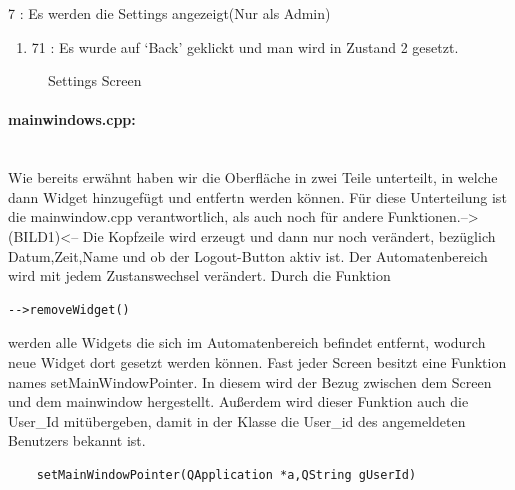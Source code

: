 \documentclass[11pt,a4paper]{article} %
\begin{document}
		7 : Es werden die Settings angezeigt(Nur als Admin)
\begin{enumerate}		
			\item	71 : Es wurde auf `Back' geklickt und man wird in Zustand 2 gesetzt.
\end{enumerate}
\begin{figure}[h]
	\caption{Settings Screen}
	\end{figure}

\paragraph{mainwindows.cpp:} $\;$ \\
	Wie bereits erwähnt haben wir die Oberfläche in zwei Teile unterteilt, in welche dann Widget hinzugefügt und entfertn werden können. 
	Für diese Unterteilung ist die mainwindow.cpp verantwortlich, als auch noch für andere Funktionen.-->(BILD1)<--
	Die Kopfzeile wird erzeugt und dann nur noch verändert, bezüglich Datum,Zeit,Name und ob der Logout-Button aktiv ist.
	Der Automatenbereich wird mit jedem Zustanswechsel verändert.
	Durch die Funktion 
	\begin{frame}

\begin{lstlisting}
-->removeWidget()
\end{lstlisting}
\end{frame}
werden alle Widgets die sich im Automatenbereich befindet entfernt, wodurch neue Widget dort gesetzt werden können.
	Fast jeder Screen besitzt eine Funktion names setMainWindowPointer. In diesem wird der Bezug zwischen dem Screen und dem mainwindow hergestellt.
	Außerdem wird dieser Funktion auch die User\_Id mitübergeben, damit in der Klasse die User\_id des angemeldeten Benutzers bekannt ist.
	\begin{frame}

\begin{lstlisting}
	setMainWindowPointer(QApplication *a,QString gUserId)
	\end{lstlisting}
\end{frame}
	
\end{document}

